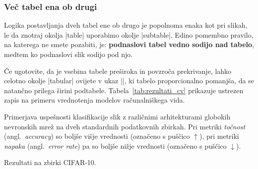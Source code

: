 \documentclass[9pt]{style/friteza}
\begin{document}
\subsubsection{Več tabel ena ob drugi}

Logika postavljanja dveh tabel ene ob drugo je popolnoma enaka kot pri slikah, le da znotraj okolja \ltx|table| uporabimo okolje \ltx|subtable|. Edino pomembno pravilo, na katerega ne smete pozabiti, je: \textbf{podnaslovi tabel vedno sodijo nad tabelo}, medtem ko podnaslovi slik sodijo pod njo. 

Če ugotovite, da je vsebina tabele preširoka in povzroča prekrivanje, lahko celotno okolje \ltx|tabular| ovijete v ukaz \ltx||, ki tabelo proporcionalno pomanjša, da se natančno prilega širini podtabele. Tabela~\ref{tab:rezultati_cv} prikazuje ustrezen zapis na primeru vrednotenja modelov računalniškega vida.

\begin{table}[htbp]
    \centering
    \caption{Primerjava uspešnosti klasifikacije slik z različnimi arhitekturami globokih nevronskih mrež na dveh standardnih podatkovnih zbirkah. Pri metriki \textit{točnost} (angl.\ \textit{accuracy}) so boljše višje vrednosti (označeno s puščico $\uparrow$), pri metriki \textit{napaka} (angl.\ \textit{error rate}) pa so boljše nižje vrednosti (označeno s puščico $\downarrow$).}
    \label{tab:rezultati_cv}
    \begin{subtable}[b]{0.48\textwidth}
        \centering
        \caption{Rezultati na zbirki CIFAR-10.}
        \label{tab:cifar10}
    \end{subtable}
    \hfill
    \begin{subtable}[b]{0.48\textwidth}
        \centering
        \caption{Rezultati na zbirki ImageNet.}
        \label{tab:imagenet}
    \end{subtable}
\end{table}
\end{document}

